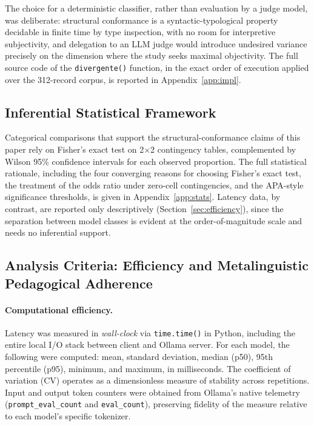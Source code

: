 \documentclass{sbc2023}%
\begin{document}
The choice for a deterministic classifier, rather than evaluation by a judge model, was deliberate: structural conformance is a syntactic-typological property decidable in finite time by type inspection, with no room for interpretive subjectivity, and delegation to an LLM judge would introduce undesired variance precisely on the dimension where the study seeks maximal objectivity. The full source code of the \texttt{divergente()} function, in the exact order of execution applied over the 312-record corpus, is reported in Appendix~\ref{app:impl}.

\subsection{Inferential Statistical Framework}

Categorical comparisons that support the structural-conformance claims of this paper rely on Fisher's exact test on 2$\times$2 contingency tables, complemented by Wilson 95\% confidence intervals for each observed proportion. The full statistical rationale, including the four converging reasons for choosing Fisher's exact test, the treatment of the odds ratio under zero-cell contingencies, and the APA-style significance thresholds, is given in Appendix~\ref{app:stats}. Latency data, by contrast, are reported only descriptively (Section~\ref{sec:efficiency}), since the separation between model classes is evident at the order-of-magnitude scale and needs no inferential support.

\subsection{Analysis Criteria: Efficiency and Metalinguistic Pedagogical Adherence}
\label{sec:criteria}

\paragraph{Computational efficiency.} Latency was measured in \textit{wall-clock} via \texttt{time.time()} in Python, including the entire local I/O stack between client and Ollama server. For each model, the following were computed: mean, standard deviation, median (p50), 95th percentile (p95), minimum, and maximum, in milliseconds. The coefficient of variation (CV) operates as a dimensionless measure of stability across repetitions. Input and output token counters were obtained from Ollama's native telemetry (\texttt{prompt\_eval\_count} and \texttt{eval\_count}), preserving fidelity of the measure relative to each model's specific tokenizer.
\end{document}
